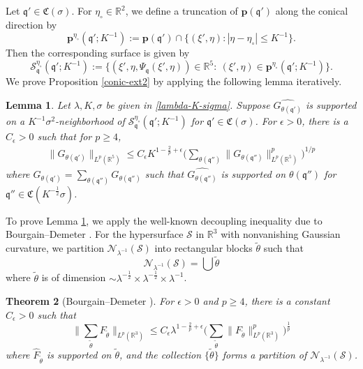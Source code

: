 \documentclass[10pt] %
{amsart}
\theoremstyle{plain}
\newtheorem{thm}{Theorem}[section]
\newtheorem{lem}[thm]{Lemma}
\numberwithin{equation}{section}
\newcommand{\R}{\mathbb R}
\newcommand{\fq}{\mathfrak q}
\newcommand{\fm}{\mathfrak{q'}}
\newcommand{\fmm}{\mathfrak{q''}}
\begin{document}
Let $\fm \in \mathfrak C(\sigma)$. For $\eta_\circ \in \R^2$, we define a truncation of $\mathbf p(\fm)$ along the conical direction by 
\[
\mathbf p^{\eta_\circ} (\fm; K^{-1}) := \mathbf p(\fm) \cap \big\{(\xi',\eta)  : 
  |\eta - \eta_\circ| \le K^{-1}\big\}  . \]
Then the corresponding surface is given by
\[
\mathcal S_{\fq}^{\eta_\circ} (\fm;K^{-1}):=\Big\{ (\xi',\eta, \Psi_{\fq}(\xi',\eta)) \in \R^5:~ (\xi',\eta) \in \mathbf p^{\eta_\circ}(\fm;K^{-1})\Big\}.
\]
We prove Proposition \ref{conic-ext2} by applying the following lemma iteratively.

\begin{lem}\label{decomp:step}
Let $\lambda, K,\sigma$ be given in \eqref{lambda-K-sigma}.
Suppose $\widehat {G_{\theta(\fm)}}$ is supported on a $K^{-1}\sigma^2$-neighborhood of $\mathcal S_{\fq}^{\eta_\circ}(\fm;K^{-1})$ for $\fm \in \mathfrak C(\sigma)$.  For $\epsilon>0$, there is a $C_\epsilon>0$ such that for $p\ge4$,
\begin{align}\label{dcp:small scale}
\big\| G_{\theta(\fm)} \big\|_{L^p(\mathbb R^5)} \le C_\epsilon K^{1-\frac2p+\epsilon} \Big( \sum_{\theta(\fmm)} \| G_{\theta(\fmm)}\|_{L^p(\mathbb R^5)}^p \Big)^{1/p}
\end{align}
where $G_{\theta(\fm)} = \sum_{\theta(\fmm)} G_{\theta(\fmm)}$
such that $\widehat{G_{\theta(\fmm)}}$ is supported on $\theta(\fmm)$ for 
$\fmm \in \mathfrak C(K^{-\frac12}\sigma)$.
\end{lem}


To prove Lemma \ref{decomp:step}, we apply the well-known decoupling inequality due to Bourgain--Demeter \cite{BD}.
For the hypersurface $\mathcal S$ in $\R^3$ with nonvanishing Gaussian curvature,
we partition $\mathcal N_{\lambda^{-1}}(\mathcal S)$ into rectangular blocks $\widetilde{\theta}$ such that
\[
\mathcal N_{\lambda^{-1}}(\mathcal S)
=\bigcup \widetilde{\theta}
\]
where $\widetilde{\theta}$ is of dimension $\sim \lambda^{-\frac12}\times \lambda^{-\frac12}\times \lambda^{-1} $.

\begin{thm}[Bourgain--Demeter \cite{BD}]\label{dcp-nonv}
For $\epsilon>0$ and $p\ge4$, there is a constant $C_\epsilon>0$ such that
\[
\big\| \sum_{\widetilde{\theta}} F_{\widetilde{\theta}} \big\|_{L^p(\R^3)} \le C_\epsilon \lambda^{1-\frac2p+\epsilon} \Big( \sum_{\widetilde{\theta}} \|F_{\widetilde{\theta}}\|_{L^p(\R^3)}^p \Big)^{\frac 1p}
\]
where $\widehat F_{\widetilde{\theta}}$ is supported on $\widetilde\theta$, and the collection $\{\widetilde{\theta}\}$ forms a partition of  $\mathcal N_{\lambda^{-1}}(\mathcal S)$.
\end{thm}
\end{document}
